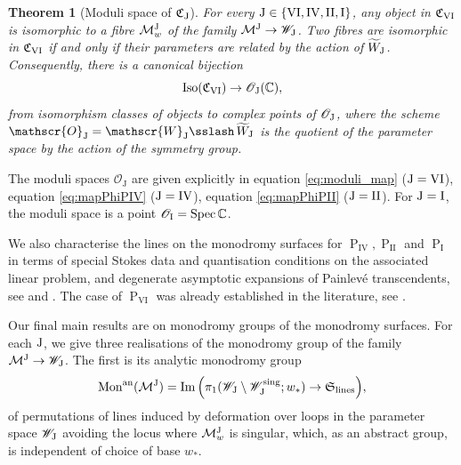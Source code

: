 \documentclass[a4paper,reqno]{amsart}
\numberwithin{equation}{section}
\newcommand{\C}{\mathbb{C}}
\newcommand{\pain}[1]{\operatorname{P}_{\mathrm{#1}}}
\DeclareMathOperator{\Spec}{Spec}
\newtheorem{maintheorem}{Theorem}
\numberwithin{equation}{section}
\begin{document}
\begin{maintheorem}[Moduli space of $\mathfrak{C}_{\rm{J}}$] \label{mainthm:categoryandmodulispace}
    For every $\rm{J}\in\{\rm{VI},\rm{IV},\rm{II},\rm{I}\}$,
 any object in $\mathfrak{C}_{\rm{VI}}$ is isomorphic to a fibre $\mathcal{M}_w^{\rm{J}}$ of the family $\mathcal{M}^{\rm{J}}\to \mathscr{W}_{\rm{J}}$.
 Two fibres are isomorphic in $\mathfrak{C}_{\rm{VI}}$ if and only if their parameters are related by the action of $\widetilde{W}_{\rm{J}}$.
 Consequently, there is a canonical bijection 
 $$ \operatorname{Iso}(\mathfrak{C}_{\rm{VI}}) \to \mathscr{O}_{\rm{J}}(\C),$$
from isomorphism classes of objects to complex points of $\mathscr{O}_{\rm{J}}$, where the scheme $\mathscr{O}_{\rm{J}}= \mathscr{W}_{\rm{J}} \sslash \,\widetilde{W}_{\rm{J}} $ is the quotient of the parameter space by the action of the symmetry group.
\end{maintheorem}
The moduli spaces  $\mathscr{O}_{\mathrm{J}}$ are given explicitly in equation \eqref{eq:moduli_map} ($\rm{J}=\rm{VI}$), equation \eqref{eq:mapPhiPIV} ($\rm{J}=\rm{IV}$), equation \eqref{eq:mapPhiPII} ($\rm{J}=\rm{II}$). For $\rm{J}=\rm{I}$, the moduli space is a point $\mathscr{O}_{\rm{I}}=\operatorname{\Spec}\C$.


We also characterise the lines on the monodromy surfaces for $\pain{IV},\pain{II}$ and $\pain{I}$ in terms of special Stokes data and quantisation conditions on the associated linear problem, and degenerate asymptotic expansions of Painlev\'e transcendents, see  and . 
The case of $\pain{VI}$ was already established in the literature, see . 


Our final main results are on monodromy groups of the monodromy surfaces.
For each $\rm{J}$, we give three realisations of the monodromy group of the family $\mathcal{M}^{\rm{J}}\to\mathscr{W}_{\rm{J}}$.
The first is its analytic monodromy group
$$ \operatorname{Mon}^{\operatorname{an}}(\mathcal{M}^{\rm{J}}) = \operatorname{Im} \Big( \pi_1( \mathscr{W}_{\rm{J}} \setminus \mathscr{W}_{\rm{J}}^{\operatorname{sing}}; w_*) \to \mathfrak{S}_{\operatorname{lines}} \Big) ,$$
of permutations of lines induced by deformation over loops in the parameter space $\mathscr{W}_{\rm{J}}$ avoiding the locus where $\mathcal{M}^{\rm{J}}_w$ is singular, which, as an abstract group, is independent of choice of base $w_*$.
\end{document}
